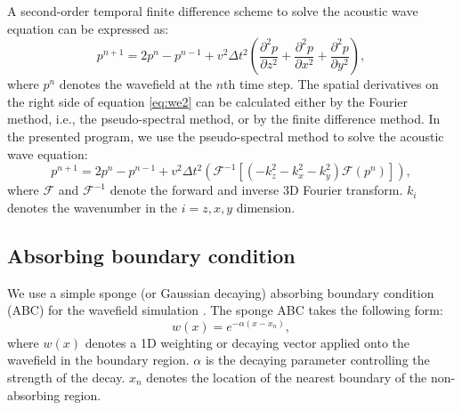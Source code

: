 A second-order temporal finite difference scheme to solve the acoustic wave equation can be expressed as:
\begin{equation}
\label{eq:we2}
p^{n+1}=2p^{n}-p^{n-1}+v^2\Delta t^2\left(\frac{\partial^2 p}{\partial z^2} + \frac{\partial^2 p}{\partial x^2} + \frac{\partial^2 p}{\partial y^2}\right),
\end{equation}
where $p^{n}$ denotes the wavefield at the $n$th time step. The spatial derivatives on the right side of equation \ref{eq:we2} can be calculated either by the Fourier method, i.e., the pseudo-spectral method, or by the finite difference method. In the presented program, we use the pseudo-spectral method to solve the acoustic wave equation: 
\begin{equation}
\label{eq:we22}
p^{n+1}=2p^{n}-p^{n-1}+v^2\Delta t^2\left(\mathcal{F}^{-1}[(-k_z^2-k_x^2-k_y^2)\mathcal{F}(p^n)]\right),
\end{equation}
where $\mathcal{F}$ and $\mathcal{F}^{-1}$ denote the forward and inverse 3D Fourier transform. $k_i$ denotes the wavenumber in the $i=z,x,y$ dimension. 


\subsection{Absorbing boundary condition}
We use a simple sponge (or Gaussian decaying) absorbing boundary condition (ABC) for the wavefield simulation \cite[]{cerjan1985nonreflecting}. The sponge ABC takes the following form:
\begin{equation}
\label{eq:abc}
w(x)=e^{-\alpha(x-x_n)},
\end{equation}
where $w(x)$ denotes a 1D weighting or decaying vector applied onto the wavefield in the boundary region. $\alpha$ is the decaying parameter controlling the strength of the decay. $x_n$ denotes the location of the nearest boundary of the non-absorbing region. 

